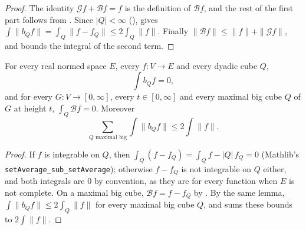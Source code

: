 \begin{proof}
\leanok
The identity $\mathcal G f + \mathcal B f = f$ is the definition of $\mathcal B f$, and the rest
of the first part follows from . Since
$|Q| < \infty$ (),  gives
$\int \|b_Q f\| = \int_Q \|f - f_Q\| \leq 2 \int_Q \|f\|$. Finally
$\|\mathcal B f\| \leq \|f\| + \|\mathcal G f\|$, and
 bounds the integral of the second term.
\end{proof}

\begin{theorem}
\label{thm:calderon-zygmund-bad-pieces-mean-mass}
\leanok
{}
For every real normed space $E$, every $f : V \to E$ and every dyadic cube $Q$,
\[
  \int b_Q f = 0 ,
\]
and for every $G : V \to [0, \infty]$, every $t \in [0, \infty]$ and every maximal big cube
$Q$ of $G$ at height $t$, $\int_Q \mathcal B f = 0$. Moreover
\[
  \sum_{Q \text{ maximal big}} \int \|b_Q f\| \leq 2 \int \|f\| .
\]
\end{theorem}

\begin{proof}
\leanok
If $f$ is integrable on $Q$, then $\int_Q (f - f_Q) = \int_Q f - |Q| \, f_Q = 0$ (Mathlib's
\texttt{setAverage\_\allowbreak sub\_\allowbreak setAverage}); otherwise $f - f_Q$ is not
integrable on $Q$ either, and both integrals are $0$ by convention, as they are for every
function when $E$ is not complete. On a maximal big cube,
$\mathcal B f = f - f_Q$ by . By the same lemma,
$\int \|b_Q f\| \leq 2 \int_Q \|f\|$ for every maximal big cube $Q$, and
 sums these bounds to $2 \int \|f\|$.
\end{proof}

